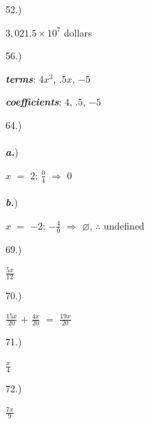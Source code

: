 \documentclass[12pt]{article}
\begin{document}
{\setlength{\parindent}{0cm}
52.) 
    \begin{center} $3,021.5\times10^{7}$ dollars \end{center}
}
{\setlength{\parindent}{0cm}
56.) 
    \begin{center} \textbf{\textit{terms}}: $4x^3$, $.5x$, $-5$ \end{center}
    \begin{center} \textbf{\textit{coefficients}}: $4$, $.5$, $-5$ \end{center}
}
{\setlength{\parindent}{0cm}
64.) 
    \paragraph{} \textit{\textbf{a.}}) \\
        \begin{center} $x$ $=$ $2$; $\frac{0}{4}$ $\Rightarrow$ $0$ \end{center}
    \paragraph{} \textit{\textbf{b.}}) \\
        \begin{center} $x$ $=$ $-2$; $-\frac{4}{0}$ $\Rightarrow$ $\varnothing$, $\therefore$ undefined \end{center}
}
{\setlength{\parindent}{0cm}
69.) 
    \begin{center} $\frac{5x}{12}$ \end{center}
}
{\setlength{\parindent}{0cm}
70.) 
    \begin{center} $\frac{15x}{20}$ $+$ $\frac{4x}{20}$ $=$ $\frac{19x}{20}$ \end{center}
}
{\setlength{\parindent}{0cm}
71.) 
    \begin{center} $\frac{x}{4}$ \end{center}
}
{\setlength{\parindent}{0cm}
72.) 
    \begin{center} $\frac{7x}{9}$ \end{center}
}
\end{document}
